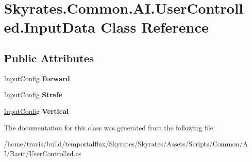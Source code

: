 \hypertarget{class_skyrates_1_1_common_1_1_a_i_1_1_user_controlled_1_1_input_data}{\section{Skyrates.\-Common.\-A\-I.\-User\-Controlled.\-Input\-Data Class Reference}
\label{class_skyrates_1_1_common_1_1_a_i_1_1_user_controlled_1_1_input_data}
}
\subsection*{Public Attributes}
\begin{DoxyCompactItemize}
\item 
\hypertarget{class_skyrates_1_1_common_1_1_a_i_1_1_user_controlled_1_1_input_data_af93478030c8c93806ebc9cee070b930d}{\hyperlink{class_skyrates_1_1_common_1_1_a_i_1_1_user_controlled_1_1_input_config}{Input\-Config} {\bfseries Forward}}\label{class_skyrates_1_1_common_1_1_a_i_1_1_user_controlled_1_1_input_data_af93478030c8c93806ebc9cee070b930d}

\item 
\hypertarget{class_skyrates_1_1_common_1_1_a_i_1_1_user_controlled_1_1_input_data_a5f05cd20ea241ae73136c8d9ef7bdfec}{\hyperlink{class_skyrates_1_1_common_1_1_a_i_1_1_user_controlled_1_1_input_config}{Input\-Config} {\bfseries Strafe}}\label{class_skyrates_1_1_common_1_1_a_i_1_1_user_controlled_1_1_input_data_a5f05cd20ea241ae73136c8d9ef7bdfec}

\item 
\hypertarget{class_skyrates_1_1_common_1_1_a_i_1_1_user_controlled_1_1_input_data_a2933dc5edef26e8100b18d1a8584da7e}{\hyperlink{class_skyrates_1_1_common_1_1_a_i_1_1_user_controlled_1_1_input_config}{Input\-Config} {\bfseries Vertical}}\label{class_skyrates_1_1_common_1_1_a_i_1_1_user_controlled_1_1_input_data_a2933dc5edef26e8100b18d1a8584da7e}

\end{DoxyCompactItemize}


The documentation for this class was generated from the following file\-:\begin{DoxyCompactItemize}
\item 
/home/travis/build/temportalflux/\-Skyrates/\-Skyrates/\-Assets/\-Scripts/\-Common/\-A\-I/\-Basic/User\-Controlled.\-cs\end{DoxyCompactItemize}
